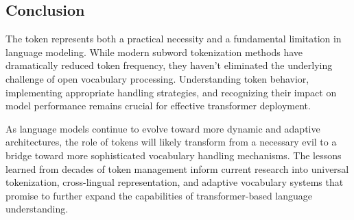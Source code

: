 \subsection{Conclusion}

The \unk{} token represents both a practical necessity and a fundamental limitation in language modeling. While modern subword tokenization methods have dramatically reduced \unk{} token frequency, they haven't eliminated the underlying challenge of open vocabulary processing. Understanding \unk{} token behavior, implementing appropriate handling strategies, and recognizing their impact on model performance remains crucial for effective transformer deployment.

As language models continue to evolve toward more dynamic and adaptive architectures, the role of \unk{} tokens will likely transform from a necessary evil to a bridge toward more sophisticated vocabulary handling mechanisms. The lessons learned from decades of \unk{} token management inform current research into universal tokenization, cross-lingual representation, and adaptive vocabulary systems that promise to further expand the capabilities of transformer-based language understanding.